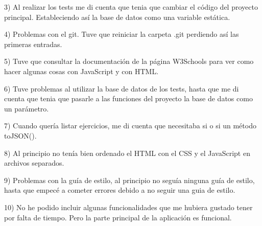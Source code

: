 3) Al realizar los tests me di cuenta que tenia que cambiar el código del proyecto principal. Estableciendo así la base de datos como una variable estática.

4) Problemas con el git. Tuve que reiniciar la carpeta .git perdiendo así las primeras entradas.

5) Tuve que consultar la documentación de la página W3\+Schools para ver como hacer algunas cosas con Java\+Script y con H\+T\+ML.

6) Tuve problemas al utilizar la base de datos de los tests, hasta que me di cuenta que tenia que pasarle a las funciones del proyecto la base de datos como un parámetro.

7) Cuando quería listar ejercicios, me di cuenta que necesitaba si o si un método to\+J\+S\+O\+N().

8) Al principio no tenía bien ordenado el H\+T\+ML con el C\+SS y el Java\+Script en archivos separados.

9) Problemas con la guía de estilo, al principio no seguía ninguna guía de estilo, hasta que empecé a cometer errores debido a no seguir una guia de estilo.

10) No he podido incluir algunas funcionalidades que me hubiera gustado tener por falta de tiempo. Pero la parte principal de la aplicación es funcional.



 